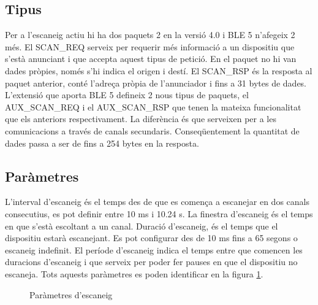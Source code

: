 \subsection{Tipus}
Per a l'escaneig actiu hi ha dos paquets 2 en la versió 4.0 i BLE 5 n'afegeix 2 més.
El SCAN\_REQ serveix per requerir més informació a un dispositiu que s'està anunciant i que accepta aquest tipus de petició.
En el paquet no hi van dades pròpies, només s'hi indica el origen i destí.
El SCAN\_RSP és la resposta al paquet anterior, conté l'adreça pròpia de l'anunciador i fins a 31 bytes de dades.
L'extensió que aporta BLE 5 defineix 2 nous tipus de paquets, el AUX\_SCAN\_REQ i el AUX\_SCAN\_RSP que tenen la mateixa funcionalitat que els anteriors respectivament.
La diferència és que serveixen per a les comunicacions a través de canals secundaris.
Conseqüentement la quantitat de dades passa a ser de fins a 254 bytes en la resposta.

\subsection{Paràmetres}
L'interval d'escaneig és el temps des de que es comença a escanejar en dos canals consecutius, es pot definir entre 10 ms i 10.24 s.
La finestra d'escaneig és el temps en que s'està escoltant a un canal.
Duració d'escaneig, és el temps que el dispositiu estarà escanejant.
Es pot configurar des de 10 ms fins a 65 segons o escaneig indefinit.
El període d'escaneig indica el temps entre que comencen les duracions d'escaneig i que serveix per poder fer pauses en que el dispositiu no escaneja.
Tots aquests paràmetres es poden identificar en la figura \ref{fig:escaneig_canals}.

\begin{figure}[!h]
	\begin{center}
		\begin{subfigmatrix}{1}
		\end{subfigmatrix}
	\end{center}
	\caption{Paràmetres d'escaneig}
	\label{fig:escaneig_canals}
\end{figure}

